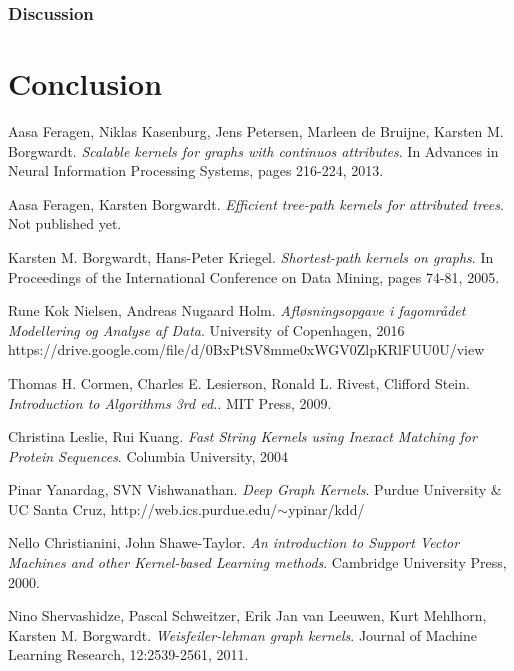 \documentclass{article}
\begin{document}
\subsubsection{Discussion}

\section{Conclusion}



\newpage

\renewcommand\refname{References}
\begin{thebibliography}{9}
		Aasa Feragen, Niklas Kasenburg, Jens Petersen, Marleen de Bruijne, Karsten M. Borgwardt.
		\emph{Scalable kernels for graphs with continuos attributes}.
		In Advances in Neural Information Processing Systems, pages 216-224, 2013.

		Aasa Feragen, Karsten Borgwardt.
		\emph{Efficient tree-path kernels for attributed trees}.
		Not published yet.

		Karsten M. Borgwardt, Hans-Peter Kriegel.
		\emph{Shortest-path kernels on graphs}.
		In Proceedings of the International Conference on Data Mining, pages 74-81, 2005.
		
		Rune Kok Nielsen, Andreas Nugaard Holm.
		\emph{Afløsningsopgave i fagområdet Modellering og Analyse af Data}.
		University of Copenhagen, 2016\\
		https://drive.google.com/file/d/0BxPtSV8mme0xWGV0ZlpKRlFUU0U/view
		
		Thomas H. Cormen, Charles E. Lesierson, Ronald L. Rivest, Clifford Stein.
		\emph{Introduction to Algorithms 3rd ed.}.
		MIT Press, 2009.
		
		Christina Leslie, Rui Kuang.
		\emph{Fast String Kernels using Inexact Matching for Protein Sequences}.
		Columbia University, 2004
		
		Pinar Yanardag, SVN Vishwanathan.
		\emph{Deep Graph Kernels}.
		Purdue University \& UC Santa Cruz, http://web.ics.purdue.edu/$\sim$ypinar/kdd/
		
		Nello Christianini, John Shawe-Taylor.
		\emph{An introduction to Support Vector Machines and other Kernel-based Learning methods}.
		Cambridge University Press, 2000.
		
		Nino Shervashidze, Pascal Schweitzer, Erik Jan van Leeuwen, Kurt
		Mehlhorn, Karsten M. Borgwardt.
		\emph{Weisfeiler-lehman graph kernels}.
		Journal	of Machine Learning Research, 12:2539-2561, 2011.
		
\end{thebibliography}
\end{document}
